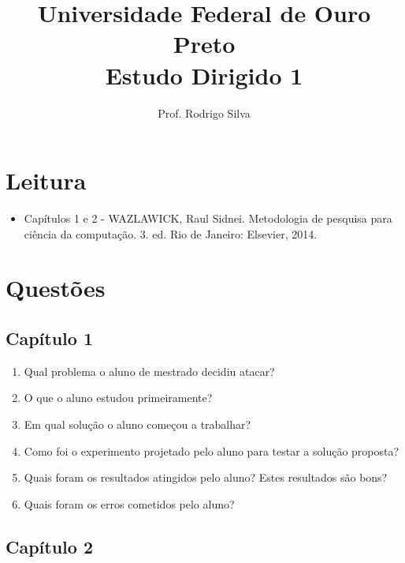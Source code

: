 \documentclass{article}
\title{\vspace{-2 cm}Universidade Federal de Ouro Preto \\ Estudo Dirigido 1}
\author{Prof. Rodrigo Silva}
\date{}
\begin{document}
\maketitle

\section{Leitura}

\begin{itemize}
    \item Capítulos 1 e 2 - WAZLAWICK, Raul Sidnei. Metodologia de pesquisa para ciência da computação. 3. ed. Rio de Janeiro: Elsevier, 2014.
\end{itemize}

\section{Questões}

\subsection{Capítulo 1}

\begin{enumerate}

\item Qual problema o aluno de mestrado decidiu atacar?

\item O que o aluno estudou primeiramente?

\item Em qual solução o aluno começou a trabalhar?  

\item Como foi o experimento projetado pelo aluno para testar a solução proposta?

\item Quais foram os resultados atingidos pelo aluno? Estes resultados são bons? 

\item Quais foram os erros cometidos pelo aluno?

\end{enumerate}

\subsection{Capítulo 2}
\end{document}
